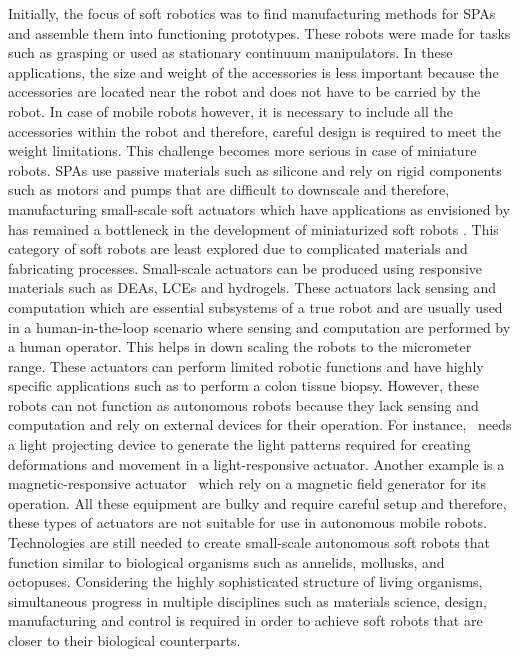 {Initially, the focus of soft robotics was to find manufacturing methods for SPAs and assemble them into functioning prototypes. These robots were made for tasks such as grasping or used as stationary continuum manipulators. In these applications, the size and weight of the accessories is less important because the accessories are located near the robot and does not have to be carried by the robot. In case of mobile robots however, it is necessary to include all the accessories within the robot and therefore, careful design is required to meet the weight limitations. This challenge becomes more serious in case of miniature robots. SPAs use passive materials such as silicone and rely on rigid components such as motors and pumps that are difficult to downscale and therefore, manufacturing small-scale soft actuators which have applications as envisioned by \cite{Hines2017} has remained a bottleneck in the development of miniaturized soft robots \cite{Majidi2019}. This category of soft robots are least explored due to complicated materials and fabricating processes. Small-scale actuators can be produced using responsive materials such as DEAs, LCEs and hydrogels. These actuators lack sensing and computation which are essential subsystems of a true robot and are usually used in a human-in-the-loop scenario where sensing and computation are performed by a human operator. This helps in down scaling the robots to the micrometer range. These actuators can perform limited robotic functions and have highly specific applications such as to perform a colon tissue biopsy. However, these robots can not function as autonomous robots because they lack sensing and computation and rely on external devices for their operation. For instance,~\cite{Palagi2016} needs a light projecting device to generate the light patterns required for creating deformations and movement in a light-responsive actuator. Another example is a magnetic-responsive actuator~\cite{Kim2018} which rely on a magnetic field generator for its operation. All these equipment are bulky and require careful setup and therefore, these types of actuators are not suitable for use in autonomous mobile robots. Technologies are still needed to create small-scale autonomous soft robots that function similar to biological organisms such as annelids, mollusks, and octopuses. Considering the highly sophisticated structure of living organisms, simultaneous progress in multiple disciplines such as materials science, design, manufacturing and control is required in order to achieve soft robots that are closer to their biological counterparts.

}
